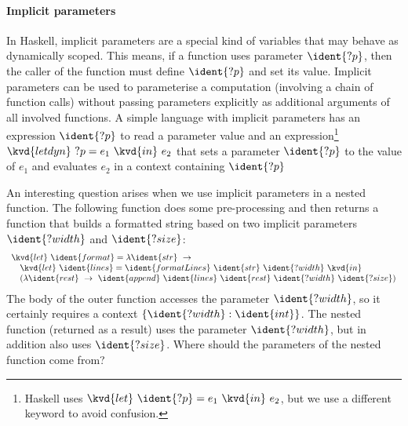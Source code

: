 
\paragraph{Implicit parameters} In Haskell, implicit parameters \cite{app-implicit-parameters} are 
a special kind of variables that may behave as dynamically scoped. This means, if a function uses 
parameter $\ident{?p}$, then the caller of the function must define $\ident{?p}$ and set its value.
Implicit parameters can be used to parameterise a computation (involving a chain of function calls)
without passing parameters explicitly as additional arguments of all involved functions. A simple 
language with implicit parameters has an expression $\ident{?p}$ to read a parameter value and an 
expression\footnote{Haskell uses $\kvd{let}~\ident{?p} = e_1~\kvd{in}~e_2$, but we use a different keyword to 
avoid confusion.} $\kvd{letdyn}~?p = e_1~\kvd{in}~e_2$ that sets a parameter $\ident{?p}$ to the value of $e_1$ 
and evaluates $e_2$ in a context containing $\ident{?p}$

An interesting question arises when we use implicit parameters in a nested function. The following 
function does some pre-processing and then returns a function that builds a formatted string based 
on two implicit parameters $\ident{?width}$ and $\ident{?size}$:
%
\begin{equation*}
\begin{array}{l}
\kvd{let}~\ident{format} = \lambda \ident{str}~\rightarrow \\
\quad \kvd{let}~\ident{lines} = \ident{formatLines}~\ident{str}~\ident{?width}~\kvd{in}\\
\quad (\lambda \ident{rest}~\rightarrow~\ident{append}~
         \ident{lines}~\ident{rest}~\ident{?width}~\ident{?size})\\
\end{array}
\end{equation*}
%
The body of the outer function accesses the parameter $\ident{?width}$, so it certainly requires a context 
$\{ \ident{?width} : \ident{int} \}$. The nested function (returned as a result) uses the parameter 
$\ident{?width}$, but in addition also uses $\ident{?size}$. Where should the parameters of the nested 
function come from?


